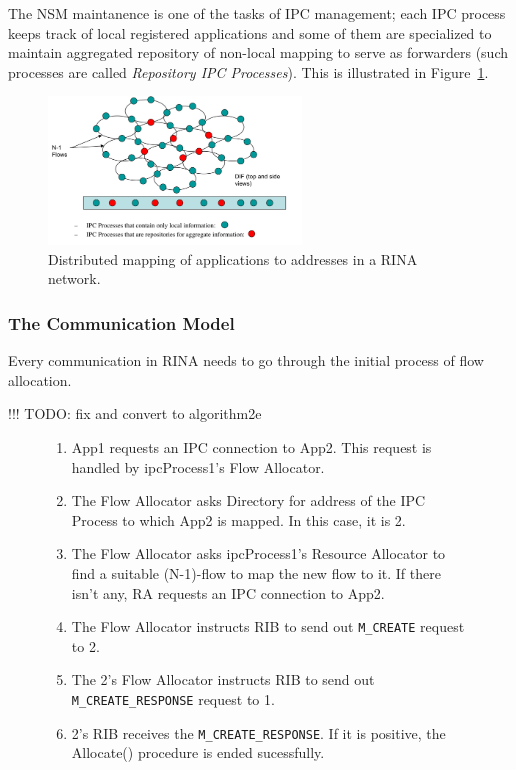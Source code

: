                 The NSM maintanence is one of the tasks of IPC management; each IPC process keeps track of local registered applications and some of them are specialized to maintain aggregated repository of non-local mapping to serve as forwarders (such processes are called \emph{Repository IPC Processes}). This is illustrated in Figure~\ref{fig:rina_nsm}.

                \begin{figure}[H]
                    \begin{center}
                        \includegraphics[width=0.6\textwidth]{fig/archs_rina-nsm.png}
                      \caption{Distributed mapping of applications to addresses in a RINA network.}
                      \label{fig:rina_nsm}
                    \end{center}
                \end{figure}


            \subsubsection{The Communication Model}\label{archs:rina:communication}

                Every communication in RINA needs to go through the initial process of flow allocation.

                !!! TODO: fix and convert to algorithm2e

                \begin{figure}[H]
                    \begin{enumerate}
                        \item App1 requests an IPC connection to App2. This request is handled by ipcProcess1's Flow Allocator.
                        \item The Flow Allocator asks Directory for address of the IPC Process to which App2 is mapped. In this case, it is 2.
                        \item The Flow Allocator asks ipcProcess1's Resource Allocator to find a suitable (N-1)-flow to map the new flow to it. If there isn't any, RA requests an IPC connection to App2.
                        \item The Flow Allocator instructs RIB to send out \texttt{M\_CREATE} request to 2.
                        \item The 2's Flow Allocator instructs RIB to send out \texttt{M\_CREATE\_RESPONSE} request to 1.
                        \item 2's RIB receives the \texttt{M\_CREATE\_RESPONSE}. If it is positive, the Allocate() procedure is ended sucessfully.
                    \end{enumerate}
                \end{figure}


